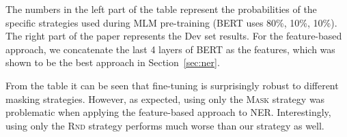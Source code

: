 \documentclass[11pt,a4paper]{article}
\begin{document}
The numbers in the left part of the table represent the probabilities of the specific strategies used during MLM pre-training (BERT uses 80\%, 10\%, 10\%). The right part of the paper represents the Dev set results. For the feature-based
approach, we concatenate the last 4 layers of BERT as the features, which
was shown to be the best approach in Section~\ref{sec:ner}.

From the table it can be seen that fine-tuning is surprisingly robust to
different masking strategies. However, as expected, using only the \textsc{Mask} strategy
was problematic when applying the feature-based approach to NER. Interestingly,
using only the \textsc{Rnd} strategy performs much worse than our strategy as well.






 

 
\end{document}
